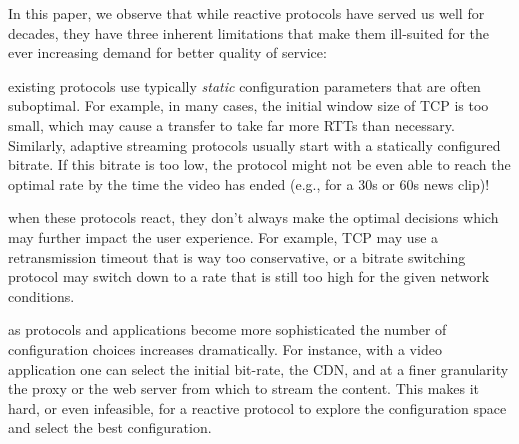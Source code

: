 In this paper, we observe that while reactive protocols have served us well for decades, 
they have three inherent limitations that make them ill-suited for the ever increasing demand for better quality of service: 

 existing protocols use typically \emph{static} configuration parameters that are often suboptimal. For example, in many cases, the initial window size of TCP is too small, which may cause a transfer to take far more RTTs than necessary. Similarly, adaptive streaming protocols usually start with a statically configured bitrate. If this bitrate is too low, the protocol might not be even able to reach the optimal rate by the time the video has ended (e.g., for a 30s or 60s news clip)!

 when these protocols react, they don't always make the optimal decisions which may further impact the user experience. For example, TCP may use a retransmission timeout that is way too conservative, or a bitrate switching protocol may switch down to a rate that is still too high for the given network conditions.

 as protocols and applications become more sophisticated the number of configuration choices increases dramatically. For instance, with a video application one can select the initial bit-rate, the CDN, and at a finer granularity the proxy or the web server from which to stream the content. This makes it hard, or even infeasible, for a reactive protocol to explore the configuration space and select the best configuration.



